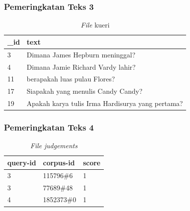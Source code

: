 \documentclass{beamer}
\newcommand{\f}[1]{\textit{#1}}
\begin{document}
\begin{frame}
\frametitle{Pemeringkatan Teks 3}

    \begin{table}[!ht]
        \centering
        \caption{\f{File} kueri}
        \label{tab:query-file-example}
        \begin{tabular}{|l|p{}|}
            \hline
            \textbf{\_id} & \textbf{text}                                                                 \\ \hline
            3             & Dimana James Hepburn meninggal?                                              \\ \hline
            4             & Dimana Jamie Richard Vardy lahir?                                            \\ \hline
            11            & berapakah luas pulau Flores?                                                 \\ \hline
            17            & Siapakah yang menulis Candy Candy?                                           \\ \hline
            19            & Apakah karya tulis Irma Hardisurya yang pertama?                              \\ \hline
        \end{tabular}
    \end{table}
\end{frame}


\begin{frame}
\frametitle{Pemeringkatan Teks 4}

    \begin{table}[!ht]
        \centering
        \caption{\f{File judgements}}
        \label{tab:judgements-file-example}
        \begin{tabular}{|l|l|l|}
            \hline
            \textbf{query-id} & \textbf{corpus-id} & \textbf{score} \\ \hline
            3                 & 115796\#6          & 1              \\ \hline
            3                 & 77689\#48          & 1              \\ \hline
            4                 & 1852373\#0         & 1              \\ \hline
        \end{tabular}
    \end{table}
\end{frame}
\end{document}
